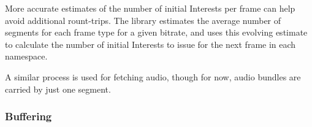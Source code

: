 \documentclass{icn/sig-alternate-2013} %
\begin{document}
More accurate estimates of the number of initial Interests per frame can help avoid additional rount-trips.
The library estimates the average number of segments for each frame type for a given bitrate, and uses this evolving estimate to calculate the number of initial Interests to issue for the next frame in each namespace. %

A similar process is used for fetching audio, though for now, audio bundles are carried by just one segment.


\subsubsection{Buffering}

\end{document}
